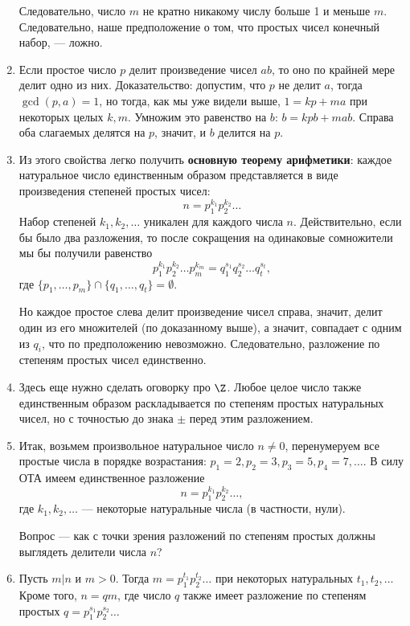 \begin{enumerate}
Следовательно, число $m$ не кратно никакому числу больше 1 и меньше $m$. Следовательно, наше предположение о том, что простых чисел конечный набор, --- ложно.

\item Если простое число $p$ делит произведение чисел $ab$, то оно по крайней мере делит одно из них. Доказательство: допустим, что $p$ не делит $a$, тогда $\gcd(p,a)=1$, но тогда, как мы уже видели выше, $1=kp+ma$ при некоторых целых $k,m$. Умножим это равенство на $b$: $b=kpb+mab$. Справа оба слагаемых делятся на $p$, значит, и $b$ делится на $p$.
\item Из этого свойства легко получить \textbf{основную теорему арифметики}: каждое натуральное число единственным образом представляется в виде произведения степеней простых чисел:
$$
n=p_1^{k_1}p_2^{k_2}\dots
$$
Набор степеней $k_1,k_2,\dots$ уникален для каждого числа $n$. Действительно, если бы было два разложения, то после сокращения на одинаковые сомножители мы бы получили равенство
$$
p_1^{k_1}p_2^{k_2}\dots p_m^{k_m} = q_1^{s_1}q_2^{s_2}\dots q_t^{s_t},
$$
где $\{p_1,\dots,p_m\}\cap\{q_1,\dots,q_t\}=\emptyset$.

Но каждое простое слева делит произведение чисел справа, значит, делит один из его множителей (по доказанному выше), а значит, совпадает с одним из $q_i$, что по предположению невозможно. Следовательно, разложение по степеням простых чисел единственно.
\item Здесь еще нужно сделать оговорку про $\Z$. Любое целое число также единственным образом раскладывается по степеням простых натуральных чисел, но с точностью до знака $\pm$ перед этим разложением.

\item Итак, возьмем произвольное натуральное число $n\ne 0$, перенумеруем все простые числа в порядке возрастания: $p_1=2, p_2=3, p_3=5, p_4=7,\dots$. В силу ОТА имеем единственное разложение
$$
n=p_1^{k_1}p_2^{k_2}\dots,
$$
где $k_1,k_2,\dots$ --- некоторые натуральные числа (в частности, нули).


Вопрос --- как с точки зрения разложений по степеням простых должны выглядеть делители числа $n$?

\item Пусть $m|n$ и $m>0$. Тогда $m=p_1^{t_1}p_2^{t_2}\dots$ при некоторых натуральных $t_1,t_2,\dots$
Кроме того, $n=qm$, где число $q$ также имеет разложение по степеням простых $q=p_1^{s_1}p_2^{s_2}\dots$


\end{enumerate}

